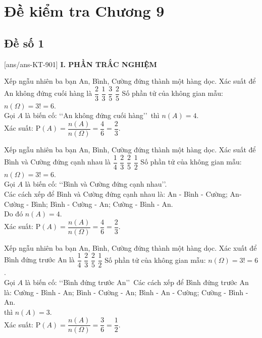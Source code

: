 \section*{Đề kiểm tra Chương 9}
\subsection*{Đề số 1}
\setcounter{ex}{0}\setcounter{bt}{0}
[ans/ans-KT-901]
\noindent\textbf{I. PHẦN TRẮC NGHIỆM}
\begin{ex}%
	Xếp ngẫu nhiên ba bạn An, Bình, Cường đứng thành một hàng dọc. Xác suất để An không đứng cuối hàng là
	\choice
	{\True $\dfrac{2}{3}$}
	{$\dfrac{1}{3}$}
	{$\dfrac{3}{5}$}
	{$\dfrac{2}{5}$}	
	\loigiai
	{
		Số phần tử của không gian mẫu: $n(\Omega)=3!=6$.\\
		Gọi $A$ là biến cố: \lq\lq An không đứng cuối hàng\rq\rq \, thì $n(A)=4$.\\
		Xác suất: $\mathrm{P}(A)=\dfrac{n(A)}{n(\Omega)} =\dfrac{4}{6}=\dfrac{2}{3}$.
	}
\end{ex}
\begin{ex}%
	Xếp ngẫu nhiên ba bạn An, Bình, Cường đứng thành một hàng dọc. Xác suất để Bình và Cường đứng cạnh nhau là
	\choice
	{$\dfrac{1}{4}$}
	{\True $\dfrac{2}{3}$}
	{$\dfrac{2}{5}$}
	{$\dfrac{1}{2}$}
	\loigiai
	{
		Số phần tử của không gian mẫu: $n(\Omega)=3!=6$.\\
		Gọi $A$ là biến cố: \lq\lq Bình và Cường đứng cạnh nhau\rq\rq. \\
		Các cách xếp để Bình và Cường đứng cạnh nhau là: An - Bình - Cường; An- Cường - Bình; Bình - Cường - An; Cường - Bình - An.\\
		Do đó  $n(A)=4$.\\
		Xác suất: $\mathrm{P}(A)=\dfrac{n(A)}{n(\Omega)} =\dfrac{4}{6}=\dfrac{2}{3}$.		
	}
\end{ex}
\begin{ex}%
	Xếp ngẫu nhiên ba bạn An, Bình, Cường đứng thành một hàng dọc. Xác xuất để Bình đứng trước An là
	\choice
	{$\dfrac{1}{4}$}
	{\True $\dfrac{2}{3}$}
	{$\dfrac{2}{5}$}
	{$\dfrac{1}{2}$}
	\loigiai
	{
		Số phần tử của không gian mẫu: $n(\Omega)=3!=6$.\\
		Gọi $A$ là biến cố: \lq\lq Bình đứng trước An\rq\rq \, 
		Các cách xếp để Bình đứng trước An là: Cường - Bình - An; Bình - Cường - An; Bình - An - Cường; Cường - Bình - An.\\
		thì $n(A)=3$.\\
		Xác suất: $\mathrm{P}(A)=\dfrac{n(A)}{n(\Omega)} =\dfrac{3}{6}=\dfrac{1}{2}$.			
	}
\end{ex}
